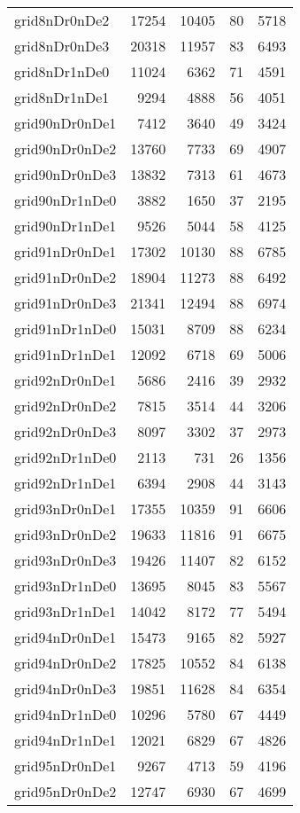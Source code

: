 \begin{longtable}{lrrrr}
grid8nDr0nDe2 & 17254 & 10405 & 80 & 5718 \\
grid8nDr0nDe3 & 20318 & 11957 & 83 & 6493 \\
grid8nDr1nDe0 & 11024 & 6362 & 71 & 4591 \\
grid8nDr1nDe1 & 9294 & 4888 & 56 & 4051 \\
grid90nDr0nDe1 & 7412 & 3640 & 49 & 3424 \\
grid90nDr0nDe2 & 13760 & 7733 & 69 & 4907 \\
grid90nDr0nDe3 & 13832 & 7313 & 61 & 4673 \\
grid90nDr1nDe0 & 3882 & 1650 & 37 & 2195 \\
grid90nDr1nDe1 & 9526 & 5044 & 58 & 4125 \\
grid91nDr0nDe1 & 17302 & 10130 & 88 & 6785 \\
grid91nDr0nDe2 & 18904 & 11273 & 88 & 6492 \\
grid91nDr0nDe3 & 21341 & 12494 & 88 & 6974 \\
grid91nDr1nDe0 & 15031 & 8709 & 88 & 6234 \\
grid91nDr1nDe1 & 12092 & 6718 & 69 & 5006 \\
grid92nDr0nDe1 & 5686 & 2416 & 39 & 2932 \\
grid92nDr0nDe2 & 7815 & 3514 & 44 & 3206 \\
grid92nDr0nDe3 & 8097 & 3302 & 37 & 2973 \\
grid92nDr1nDe0 & 2113 & 731 & 26 & 1356 \\
grid92nDr1nDe1 & 6394 & 2908 & 44 & 3143 \\
grid93nDr0nDe1 & 17355 & 10359 & 91 & 6606 \\
grid93nDr0nDe2 & 19633 & 11816 & 91 & 6675 \\
grid93nDr0nDe3 & 19426 & 11407 & 82 & 6152 \\
grid93nDr1nDe0 & 13695 & 8045 & 83 & 5567 \\
grid93nDr1nDe1 & 14042 & 8172 & 77 & 5494 \\
grid94nDr0nDe1 & 15473 & 9165 & 82 & 5927 \\
grid94nDr0nDe2 & 17825 & 10552 & 84 & 6138 \\
grid94nDr0nDe3 & 19851 & 11628 & 84 & 6354 \\
grid94nDr1nDe0 & 10296 & 5780 & 67 & 4449 \\
grid94nDr1nDe1 & 12021 & 6829 & 67 & 4826 \\
grid95nDr0nDe1 & 9267 & 4713 & 59 & 4196 \\
grid95nDr0nDe2 & 12747 & 6930 & 67 & 4699 \\

\end{longtable}
